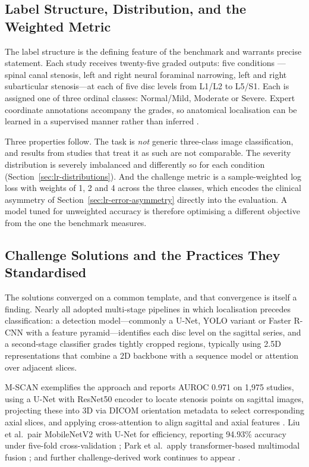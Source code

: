 \subsection{Label Structure, Distribution, and the Weighted Metric}
\label{sec:lr-label-structure}

The label structure is the defining feature of the benchmark and warrants precise
statement. Each study receives twenty-five graded outputs: five conditions
---spinal canal stenosis, left and right neural foraminal narrowing, left and
right subarticular stenosis---at each of five disc levels from L1/L2 to L5/S1.
Each is assigned one of three ordinal classes: Normal/Mild, Moderate or Severe.
Expert coordinate annotations accompany the grades, so anatomical localisation
can be learned in a supervised manner rather than inferred
\cite{rsna2024rsna,richards2026the}.

Three properties follow. The task is \emph{not} generic three-class image
classification, and results from studies that treat it as such are not
comparable. The severity distribution is severely imbalanced and differently so
for each condition (Section~\ref{sec:lr-distributions}). And the challenge metric
is a sample-weighted log loss with weights of 1, 2 and 4 across the three
classes, which encodes the clinical asymmetry of
Section~\ref{sec:lr-error-asymmetry} directly into the evaluation. A model tuned
for unweighted accuracy is therefore optimising a different objective from the
one the benchmark measures.

\subsection{Challenge Solutions and the Practices They Standardised}
\label{sec:lr-challenge-solutions}

The solutions converged on a common template, and that convergence is itself a
finding. Nearly all adopted multi-stage pipelines in which localisation precedes
classification: a detection model---commonly a U-Net, YOLO variant or Faster
R-CNN with a feature pyramid---identifies each disc level on the sagittal
series, and a second-stage classifier grades tightly cropped regions, typically
using 2.5D representations that combine a 2D backbone with a sequence model or
attention over adjacent slices.

M-SCAN exemplifies the approach and reports AUROC 0.971 on 1{,}975 studies,
using a U-Net with ResNet50 encoder to locate stenosis points on sagittal images,
projecting these into 3D via DICOM orientation metadata to select corresponding
axial slices, and applying cross-attention to align sagittal and axial features
\cite{batra2025mscan}. Liu et al.\ pair MobileNetV2 with U-Net for efficiency,
reporting 94.93\% accuracy under five-fold cross-validation
\cite{liu2025automated}; Park et al.\ apply transformer-based multimodal fusion
\cite{park2025multiview}; and further challenge-derived work continues to appear
\cite{patel2025automated,garciadecelis2025deep}.

